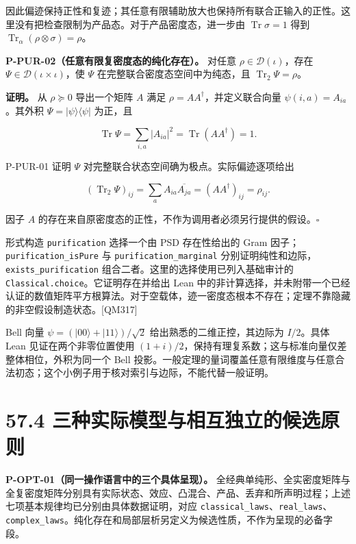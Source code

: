 \documentclass[
  11pt,
  oneside]{book}
\begin{document}
因此偏迹保持正性和复迹；其任意有限辅助放大也保持所有联合正输入的正性。这里没有把检查限制为产品态。对于产品密度态，进一步由
\(\operatorname{Tr}\sigma=1\) 得到
\(\operatorname{Tr}_{\alpha}(\rho\otimes\sigma)=\rho\)。

\protect\hypertarget{p-pur-02}{}{}

\textbf{P-PUR-02（任意有限复密度态的纯化存在）。} 对任意
\(\rho\in\mathcal D(\iota)\)，存在
\(\Psi\in\mathcal D(\iota\times\iota)\)，使 \(\Psi\)
在完整联合密度态空间中为纯态，且 \(\operatorname{Tr}_{2}\Psi=\rho\)。

\textbf{证明。} 从 \(\rho\succeq0\) 导出一个矩阵 \(A\) 满足
\(\rho=AA^\dagger\)，并定义联合向量 \(\psi(i,a)=A_{ia}\)。其外积
\(\Psi=|\psi\rangle\langle\psi|\) 为正，且

\[
\operatorname{Tr}\Psi
=\sum_{i,a}|A_{ia}|^2
=\operatorname{Tr}(AA^\dagger)=1.
\]

P-PUR-01 证明 \(\Psi\) 对完整联合状态空间确为极点。实际偏迹逐项给出

\[
(\operatorname{Tr}_{2}\Psi)_{ij}
=\sum_a A_{ia}\overline{A_{ja}}
=(AA^\dagger)_{ij}=\rho_{ij}.
\]

因子 \(A\)
的存在来自原密度态的正性，不作为调用者必须另行提供的假设。\(\square\)

形式构造 \texttt{purification} 选择一个由 PSD 存在性给出的 Gram
因子；\texttt{purification\_\allowbreak is\allowbreak Pure} 与 \texttt{purification\_\allowbreak marginal}
分别证明纯性和边际，\texttt{exists\_\allowbreak purification}
组合二者。这里的选择使用已列入基础审计的
\texttt{Classical.\allowbreak choice}。它证明存在并给出 Lean
中的非计算选择，并未附带一个已经认证的数值矩阵平方根算法。对于空载体，迹一密度态根本不存在；定理不靠隐藏的非空假设制造状态。{[}QM317{]}

Bell 向量 \(\psi=(|00\rangle+|11\rangle)/\sqrt2\)
给出熟悉的二维正控，其边际为 \(I/2\)。具体 Lean 见证在两个非零位置使用
\((1+i)/2\)，保持有理复系数；这与标准向量仅差整体相位，外积为同一个 Bell
投影。一般定理的量词覆盖任意有限维度与任意合法初态；这个小例子用于核对索引与边际，不能代替一般证明。

\section{57.4 三种实际模型与相互独立的候选原则}

\protect\hypertarget{p-opt-01}{}{}

\textbf{P-OPT-01（同一操作语言中的三个具体呈现）。}
全经典单纯形、全实密度矩阵与全复密度矩阵分别具有实际状态、效应、凸混合、产品、丢弃和所声明过程；上述七项基本规律均已分别由具体数据证明，对应
\texttt{classical\_\allowbreak laws}、\allowbreak \texttt{real\_\allowbreak laws}、\allowbreak \texttt{complex\_\allowbreak laws}。纯化存在和局部层析另定义为候选性质，不作为呈现的必备字段。
\end{document}

